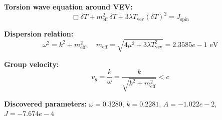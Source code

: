 
\textbf{Torsion wave equation around VEV:}
\begin{equation}
  \Box \delta T + m_{\text{eff}}^2 \, \delta T + 3\lambda T_{\text{vev}} (\delta T)^2 = J_{\text{spin}}
\end{equation}

\textbf{Dispersion relation:}
\begin{equation}
  \omega^2 = k^2 + m_{\text{eff}}^2, \quad
  m_{\text{eff}} = \sqrt{4\mu^2 + 3\lambda T_{\text{vev}}^2} = 2.3585e-1 \text{ eV}
\end{equation}

\textbf{Group velocity:}
\begin{equation}
  v_g = \frac{k}{\omega} = \frac{k}{\sqrt{k^2 + m_{\text{eff}}^2}} < c
\end{equation}

\textbf{Discovered parameters:}
$\omega = 0.3280$, \quad
$k = 0.2281$, \quad
$A = -1.022e-2$, \quad
$J = -7.674e-4$